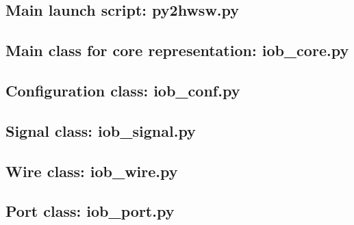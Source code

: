 \documentclass{ug}
\begin{document}
\subsection{Main launch script: py2hwsw.py}
\label{sec:launch_script}


%
%

\subsection{Main class for core representation: iob\_core.py}
\label{sec:iob_core}


\subsection{Configuration class: iob\_conf.py}
\label{sec:iob_conf}


\subsection{Signal class: iob\_signal.py}
\label{sec:iob_signal}


\subsection{Wire class: iob\_wire.py}
\label{sec:iob_wire}


\subsection{Port class: iob\_port.py}
\label{sec:iob_port}

\end{document}
